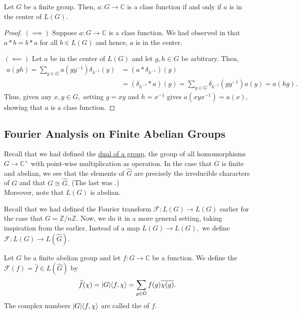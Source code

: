\begin{prop}
    Let $G$ be a finite group. Then, $a : G \to \mathbb{C}$ is a class function if and only if $a$ is in the center of $L(G).$
\end{prop}
\begin{proof}
    $(\implies)$ Suppose $a : G \to \mathbb{C}$ is a class function. We had observed in  that $a * b = b * a$ for all $b \in L(G)$ and hence, $a$ is in the center.
    
    $(\impliedby)$ Let $a$ be in the center of $L(G)$ and let $g, h \in G$ be arbitrary. Then,
    \begin{align*}
        a(gh) = \sum_{y \in G} a(gy^{-1})\delta_{h^{-1}}(y) &= (a * \delta_{h^{-1}})(g) \\
        &= (\delta_{h^{-1}} * a)(g) = \sum_{y \in G}\delta_{h^{-1}}(gy^{-1})a(y) = a(hg).
    \end{align*}
    Thus, given any $x, y \in G,$ setting $g = xy$ and $h = x^{-1}$ gives $a(xyx^{-1}) = a(x),$ showing that $a$ is a class function.
\end{proof}

\subsection{Fourier Analysis on Finite Abelian Groups}

Recall that we had defined the \hyperref[defn:dualgroup]{dual of a group}, the group of all homomorphisms $G \to \mathbb{C}^\times$ with point-wise multiplication as operation. In the case that $G$ is finite and abelian, we see that the elements of $\widehat{G}$ are precisely the irreducible characters of $G$ and that $G \cong \widehat{G}.$ (The last was .) \\
Moreover, note that $L(G)$ is abelian. 

Recall that we had defined the Fourier transform $\mathcal{F} : L(G) \to L(G)$ earlier for the case that $G = \mathbb{Z}/n\mathbb{Z}.$ Now, we do it in a more general setting, taking inspiration from the earlier. Instead of a map $L(G) \to L(G),$ we define $\mathcal{F} : L(G) \to L(\widehat{G}).$ 

\begin{defn}
    Let $G$ be a finite abelian group and let $f : G \to \mathbb{C}$ be a function. We define the  $\mathcal{F}(f) = \widehat{f} \in L(\widehat{G})$ by 
    \begin{equation*}
        \widehat{f}(\chi) = {\left\lvert G \right\lvert}\langle f, \chi\rangle = \sum_{g \in G}f(g) \overline{\chi(g)}.
    \end{equation*}
    The complex numbers ${\left\lvert G \right\lvert}\langle f, \chi\rangle$ are called the  of $f.$
\end{defn}

